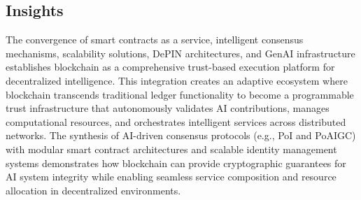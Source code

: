 \documentclass[5p,twocolumn]{elsarticle}
\begin{document}
\subsection{Insights}
The convergence of smart contracts as a service, intelligent consensus mechanisms, scalability solutions, DePIN architectures, and GenAI infrastructure establishes blockchain as a comprehensive trust-based execution platform for decentralized intelligence. This integration creates an adaptive ecosystem where blockchain transcends traditional ledger functionality to become a programmable trust infrastructure that autonomously validates AI contributions, manages computational resources, and orchestrates intelligent services across distributed networks. The synthesis of AI-driven consensus protocols (e.g., PoI and PoAIGC) with modular smart contract architectures and scalable identity management systems demonstrates how blockchain can provide cryptographic guarantees for AI system integrity while enabling seamless service composition and resource allocation in decentralized environments.
\end{document}

